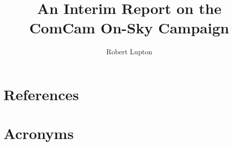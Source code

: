 \documentclass[SE,lsstdraft,authoryear,toc]{lsstdoc}
\title{An Interim Report on the ComCam On-Sky Campaign}
\author{%
Robert Lupton
}
\date{\vcsDate}
\begin{document}
\maketitle










































\appendix
\section{References} \label{sec:bib}
\renewcommand{\refname}{} %


\section{Acronyms} \label{sec:acronyms}

\end{document}
